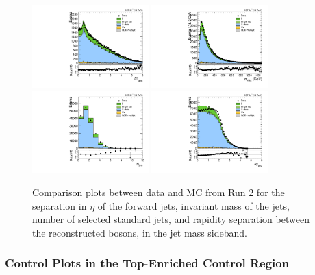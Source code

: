 \begin{figure}[htbp]
  \centering
  \includegraphics[width=0.4\textwidth]{fig/controlPlots/SB_b1_allL_allP_allC_allD_Run2_lnujj_vbfDEta.pdf}
  \includegraphics[width=0.4\textwidth]{fig/controlPlots/SB_b1_allL_allP_allC_allD_Run2_lnujj_vbfMass.pdf}\\
  \includegraphics[width=0.4\textwidth]{fig/controlPlots/SB_b1_allL_allP_allC_allD_Run2_lnujj_nJets.pdf}
  \includegraphics[width=0.4\textwidth]{fig/controlPlots/SB_b1_allL_allP_allC_allD_Run2_dy.pdf}\\
  \caption{
    Comparison plots between data and MC from Run 2 for the separation in $\eta$ of the \VBF forward jets, invariant mass of the \VBF jets, number of selected standard jets, and rapidity separation between the reconstructed bosons, in the jet mass sideband.
  }
  \label{fig:SB_controlPlotsRun2_4}
\end{figure}

\subsubsection{Control Plots in the Top-Enriched Control Region}

